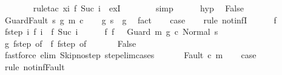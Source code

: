 \begin{isabellebody}
\ \ \ \ \ \ \isamarkupfalse%
\ {\isacharparenleft}rule{\isacharunderscore}tac\ x{\isacharequal}{\isachardoublequoteopen}{\isasymlambda}i{\isachardot}\ f\ {\isacharparenleft}Suc\ i{\isacharparenright}{\isachardoublequoteclose}\ \ exI{\isacharparenright}\isanewline
\ \ \ \ \ \ \isamarkupfalse%
\ simp\isanewline
\ \ \ \ \isamarkupfalse%
\ hyp\ \isamarkupfalse%
\ False\ \isacommand{{\isachardot}{\isachardot}}\isamarkupfalse%
\isanewline
\ \ \isamarkupfalse%
\isanewline
{}\isamarkupfalse%
\isanewline
\ \ \isamarkupfalse%
\ {\isacharparenleft}GuardFault\ s\ g\ m\ c{\isacharparenright}\isanewline
\ \ \isamarkupfalse%
\ g{\isacharcolon}\ {\isachardoublequoteopen}s\ {\isasymnotin}\ g{\isachardoublequoteclose}\ \isamarkupfalse%
\ fact\isanewline
\ \ \isamarkupfalse%
\ {\isacharquery}case\isanewline
\ \ \isamarkupfalse%
\ {\isacharparenleft}rule\ not{\isacharunderscore}infI{\isacharparenright}\isanewline
\ \ \ \ \isamarkupfalse%
\ f\isanewline
\ \ \ \ \isamarkupfalse%
\ f{\isacharunderscore}step{\isacharcolon}\ {\isachardoublequoteopen}{\isasymAnd}i{\isachardot}\ {\isasymGamma}{\isasymturnstile}f\ i\ {\isasymrightarrow}\ f\ {\isacharparenleft}Suc\ i{\isacharparenright}{\isachardoublequoteclose}\isanewline
\ \ \ \ \isamarkupfalse%
\ f{\isacharunderscore}{}{\isacharcolon}\ {\isachardoublequoteopen}f\ {}\ {\isacharequal}\ {\isacharparenleft}Guard\ m\ g\ c{\isacharcomma}\ Normal\ s{\isacharparenright}{\isachardoublequoteclose}\ \isanewline
\ \ \ \ \isamarkupfalse%
\ g\ f{\isacharunderscore}step\ {\isacharbrackleft}of\ {}{\isacharbrackright}\ f{\isacharunderscore}{}\ f{\isacharunderscore}step\ {\isacharbrackleft}of\ {}{\isacharbrackright}\isanewline
\ \ \ \ \isamarkupfalse%
\ False\isanewline
\ \ \ \ \ \ \isamarkupfalse%
\ {\isacharparenleft}fastforce\ elim{\isacharcolon}\ Skip{\isacharunderscore}no{\isacharunderscore}step\ step{\isacharunderscore}elim{\isacharunderscore}cases{\isacharparenright}\isanewline
\ \ \isamarkupfalse%
\isanewline
{}\isamarkupfalse%
\isanewline
\ \ \isamarkupfalse%
\ {\isacharparenleft}Fault\ c\ m{\isacharparenright}\isanewline
\ \ \isamarkupfalse%
\ {\isacharquery}case\isanewline
\ \ \ \ \isamarkupfalse%
\ {\isacharparenleft}rule\ not{\isacharunderscore}inf{\isacharunderscore}Fault{\isacharparenright}\isanewline

\end{isabellebody}
